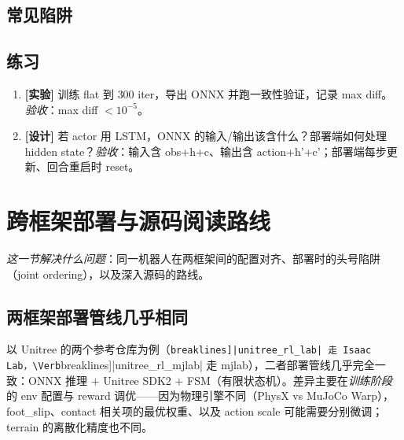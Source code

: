 \subsection{常见陷阱}


\subsection{练习}

\begin{practice}[导出与边界]
\begin{enumerate}
  \item \textbf{[实验]} 训练 flat 到 $300$ iter，导出 ONNX 并跑一致性验证，记录 max diff。\emph{验收}：max diff $<10^{-5}$。
  \item \textbf{[设计]} 若 actor 用 LSTM，ONNX 的输入/输出该含什么？部署端如何处理 hidden state？\emph{验收}：输入含 obs+h+c、输出含 action+h'+c'；部署端每步更新、回合重启时 reset。
\end{enumerate}
\end{practice}

\section{跨框架部署与源码阅读路线}
\label{sec:rlmc-train-deploy}

\emph{这一节解决什么问题}：同一机器人在两框架间的配置对齐、部署时的头号陷阱（joint ordering），以及深入源码的路线。

\subsection{两框架部署管线几乎相同}

以 Unitree 的两个参考仓库为例（\Verb[breaklines]|unitree_rl_lab| 走 Isaac Lab，\Verb[breaklines]|unitree_rl_mjlab| 走 mjlab），二者部署管线几乎完全一致：ONNX 推理 $+$ Unitree SDK2 $+$ FSM（有限状态机）。差异主要在\emph{训练阶段}的 env 配置与 reward 调优——因为物理引擎不同（PhysX vs MuJoCo Warp），foot\_slip、contact 相关项的最优权重、以及 action scale 可能需要分别微调；terrain 的离散化精度也不同。

